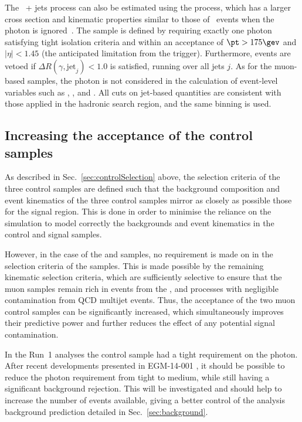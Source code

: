 The \znunu\ + jets process can also be estimated using the \gj
process, which has a larger cross section and kinematic properties
similar to those of \znunu\ events when the photon is
ignored~\cite{PAS-SUS-08-002,Bern:2011pa}. The \gj sample is defined
by requiring exactly one photon satisfying tight isolation criteria
and within an acceptance of $\pt > 175\gev$ and $|\eta| <
1.45$ (the anticipated limitation from the trigger). Furthermore, events are vetoed if $\Delta
R(\gamma,\textrm{jet}_j) < 1.0$ is satisfied, running over all jets
$j$. As for the muon-based samples, the photon is not considered in
the calculation of event-level variables such as \scalht, \mht, \met and 
\alphat. All cuts on jet-based quantities are consistent with those
applied in the hadronic search region, and the same \HT binning is
used. 

\subsection{Increasing the acceptance of the control samples\label{sec:larger}}

As described in Sec.~\ref{sec:controlSelection} above, the
selection criteria of the three control samples are defined such that
the background composition and event kinematics of the three control
samples mirror as closely as possible those for the signal
region. This is done in order to minimise the reliance on the
simulation to model correctly the backgrounds and event kinematics in
the control and signal samples.

However, in the case of the \mj and \mmj samples, no requirement is
made on \alphat in the selection criteria of the samples. This is made
possible by the remaining kinematic selection criteria, which are
sufficiently selective to ensure that the muon samples remain rich in
events from the \wj, \ttbar and \zmumu processes with negligible
contamination from QCD multijet events. Thus, the acceptance of the two 
muon control samples can be significantly increased, which simultaneously 
improves their predictive power and further reduces the effect of any potential
signal contamination. 

In the Run~1 analyses the \gj control sample had a tight requirement on the
photon. After recent developments presented in EGM-14-001%
, it
should be possible to reduce the photon requirement from tight to medium, while
still having a significant background rejection. This will be investigated and
should help to increase the number of events available, giving a better control
of the analysis background prediction detailed in Sec.~\ref{sec:background}.

